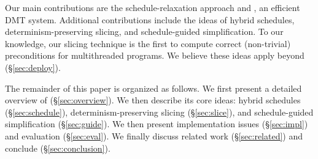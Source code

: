Our main contributions are the schedule-relaxation approach and \peregrine, an
 efficient DMT system.  Additional contributions include
the ideas of hybrid schedules, determinism-preserving slicing, and
schedule-guided simplification.  To our knowledge, our slicing technique
is the first to compute correct (non-trivial) preconditions for
multithreaded programs.
We believe these ideas apply beyond \peregrine (\S\ref{sec:deploy}).

The remainder of this paper is organized as follows.  We first present a
detailed overview of \peregrine (\S\ref{sec:overview}).  We then describe its
core ideas: hybrid schedules (\S\ref{sec:schedule}),
determinism-preserving slicing (\S\ref{sec:slice}), and schedule-guided
simplification (\S\ref{sec:guide}).  We then present implementation issues
(\S\ref{sec:impl}) and evaluation (\S\ref{sec:eval}).  We finally discuss
related work (\S\ref{sec:related}) and conclude (\S\ref{sec:conclusion}).








